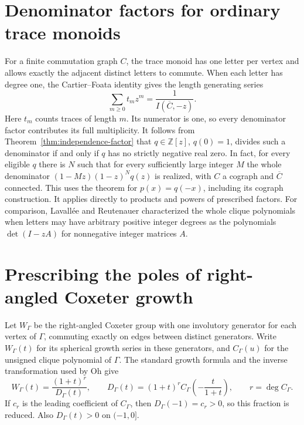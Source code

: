 \documentclass[11pt,a4paper]{article}
\begin{document}
\section{Denominator factors for ordinary trace monoids}
\label{sec:trace}
For a finite commutation graph $C$, the trace monoid has one letter per
vertex and allows exactly the adjacent distinct letters to commute.
When each letter has degree one, the Cartier--Foata identity \cite{cartier}
gives the length generating series
\[
       \sum_{m\ge0} t_m z^m
         =\frac{1}{I(\overline C,-z)}.
\]
Here $t_m$ counts traces of length $m$. Its numerator is one, so every
denominator factor contributes its full multiplicity.
It follows from Theorem~\ref{thm:independence-factor} that
$q\in\mathbb Z[z]$, $q(0)=1$, divides such a denominator if and only if
$q$ has no strictly negative real zero. In fact, for every eligible
$q$ there is $N$ such that for every sufficiently large integer $M$ the whole
denominator $(1-Mz)(1-z)^Nq(z)$ is realized, with $C$ a cograph and
$\overline C$ connected. This uses the theorem for $p(x)=q(-x)$, including
its cograph construction. It applies directly to products and powers of
prescribed factors. For comparison, Lavall\'ee and Reutenauer
\cite[Theorem~2.1]{lavallee} characterized the whole clique polynomials
when letters may have arbitrary positive integer degrees as the polynomials
$\det(I-zA)$ for nonnegative integer matrices $A$.

\section{Prescribing the poles of right-angled Coxeter growth}
\label{sec:coxeter}
Let $W_\Gamma$ be the right-angled Coxeter group with one involutory
generator for each vertex of $\Gamma$, commuting exactly on edges between
distinct generators. Write $W_\Gamma(t)$ for its spherical growth series
in these generators, and $C_\Gamma(u)$ for the unsigned clique polynomial
of $\Gamma$. The standard growth formula \cite[Eq.~(5)]{athreya}
and the inverse transformation used by Oh \cite{oh} give
\[
 W_\Gamma(t)=\frac{(1+t)^r}{D_\Gamma(t)},\qquad
 D_\Gamma(t)=(1+t)^r C_\Gamma\!\left(-\frac{t}{1+t}\right),
 \qquad r=\deg C_\Gamma.
\]
If $c_r$ is the leading coefficient of $C_\Gamma$, then
$D_\Gamma(-1)=c_r>0$, so this fraction is reduced.
Also $D_\Gamma(t)>0$ on $(-1,0]$.
\end{document}
